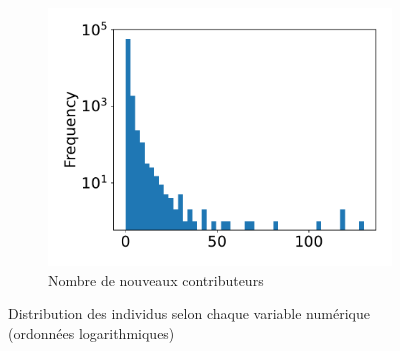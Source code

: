 \documentclass[dvipsnames,runningheads]{llncs}
\begin{document}
\begin{figure}[ht]
\begin{subfigure}[t]{0.3\textwidth}
            \includegraphics[width=\textwidth]{../experiment/data_analysis/newContributorCount_distribution}
            \caption{Nombre de nouveaux contributeurs}
        \end{subfigure}

        \caption{Distribution des individus selon chaque variable numérique (ordonnées logarithmiques)}
        \label{fig:distribution}
    \end{figure}
\end{document}
